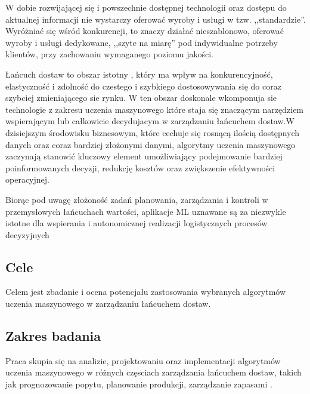    W dobie rozwijającej się i powszechnie dostępnej technologii oraz 
dostępu do aktualnej informacji nie wystarczy oferować wyroby i usługi w tzw. ,,standardzie”. 
Wyróżniać się wśród konkurencji, to znaczy działać nieszablonowo, oferować wyroby i usługi 
dedykowane, ,,szyte na miarę” pod indywidualne potrzeby klientów, przy zachowaniu 
wymaganego poziomu jakości. \cite{Jozwiak2017}

    Łańcuch dostaw to obszar istotny , który ma wpływ na  konkurencyjność, elastyczność i zdolność do czestego i szybkiego dostosowywania się do coraz szybciej zmieniającego sie rynku. W ten obszar doskonale wkomponuja sie  technologie z zakresu uczenia maszynowego które staja się znaczącym narzędziem wspierającym lub całkowicie decydujacym w zarządzaniu łańcuchem dostaw.W dzisiejszym środowisku biznesowym, które cechuje się rosnącą ilością dostępnych danych oraz coraz bardziej złożonymi danymi, algorytmy uczenia maszynowego zaczynają stanowić kluczowy element umożliwiający  podejmowanie bardziej poinformowanych decyzji, redukcję kosztów oraz zwiększenie efektywności operacyjnej.
    
    Biorąc pod uwagę złożoność zadań planowania, zarządzania i kontroli w przemysłowych łańcuchach wartości, aplikacje ML uznawane są za niezwykle istotne dla wspierania i autonomicznej realizacji logistycznych procesów decyzyjnych\cite{Weinke2023}
    
\subsection{Cele}
Celem jest zbadanie i ocena potencjału zastosowania wybranych algorytmów uczenia maszynowego w zarządzaniu łańcuchem dostaw. 
\subsection{Zakres badania}
Praca skupia się na analizie, projektowaniu oraz implementacji algorytmów uczenia maszynowego w różnych częsciach zarządzania łańcuchem dostaw, takich jak prognozowanie popytu, planowanie produkcji, zarządzanie zapasami .

